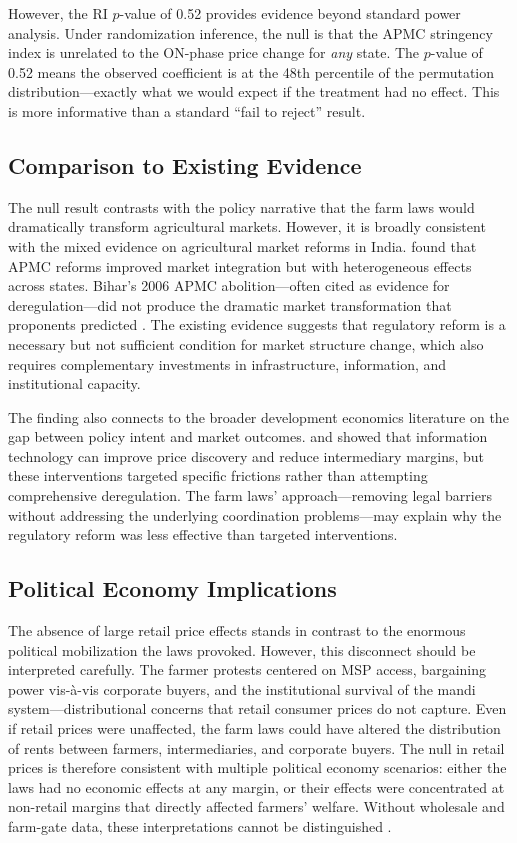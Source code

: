 \documentclass[12pt]{article}
\begin{document}
However, the RI $p$-value of 0.52 provides evidence beyond standard power analysis. Under randomization inference, the null is that the APMC stringency index is unrelated to the ON-phase price change for \emph{any} state. The $p$-value of 0.52 means the observed coefficient is at the 48th percentile of the permutation distribution---exactly what we would expect if the treatment had no effect. This is more informative than a standard ``fail to reject'' result.

\subsection{Comparison to Existing Evidence}

The null result contrasts with the policy narrative that the farm laws would dramatically transform agricultural markets. However, it is broadly consistent with the mixed evidence on agricultural market reforms in India. \citet{chatterjee2020apmc} found that APMC reforms improved market integration but with heterogeneous effects across states. Bihar's 2006 APMC abolition---often cited as evidence for deregulation---did not produce the dramatic market transformation that proponents predicted \citep{chand2015agricultural}. The existing evidence suggests that regulatory reform is a necessary but not sufficient condition for market structure change, which also requires complementary investments in infrastructure, information, and institutional capacity.

The finding also connects to the broader development economics literature on the gap between policy intent and market outcomes. \citet{jensen2007digital} and \citet{goyal2010information} showed that information technology can improve price discovery and reduce intermediary margins, but these interventions targeted specific frictions rather than attempting comprehensive deregulation. The farm laws' approach---removing legal barriers without addressing the underlying coordination problems---may explain why the regulatory reform was less effective than targeted interventions.

\subsection{Political Economy Implications}

The absence of large retail price effects stands in contrast to the enormous political mobilization the laws provoked. However, this disconnect should be interpreted carefully. The farmer protests centered on MSP access, bargaining power vis-\`{a}-vis corporate buyers, and the institutional survival of the mandi system---distributional concerns that retail consumer prices do not capture. Even if retail prices were unaffected, the farm laws could have altered the distribution of rents between farmers, intermediaries, and corporate buyers. The null in retail prices is therefore consistent with multiple political economy scenarios: either the laws had no economic effects at any margin, or their effects were concentrated at non-retail margins that directly affected farmers' welfare. Without wholesale and farm-gate data, these interpretations cannot be distinguished \citep{aggarwal2024political}.
\end{document}
